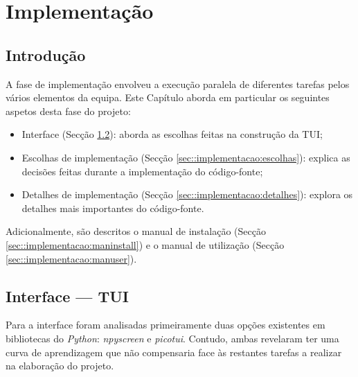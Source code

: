\chapter{Implementação}
\label{ch::implementacao}

\section{Introdução}
\label{sec::implementacao:intro}

A fase de implementação envolveu a execução paralela de diferentes tarefas pelos vários elementos da equipa. Este Capítulo aborda em particular os seguintes aspetos desta fase do projeto:

\begin{itemize}
    \item Interface (Secção \ref{sec::implementacao:tui}): aborda as escolhas feitas na construção da \acf{TUI};
    \item Escolhas de implementação (Secção \ref{sec::implementacao:escolhas}): explica as decisões feitas durante a implementação do código-fonte;
    \item Detalhes de implementação (Secção \ref{sec::implementacao:detalhes}): explora os detalhes mais importantes do código-fonte.
\end{itemize}

Adicionalmente, são descritos o manual de instalação (Secção \ref{sec::implementacao:maninstall}) e o manual de utilização (Secção \ref{sec::implementacao:manuser}).


\section{Interface --- \ac{TUI}}
\label{sec::implementacao:tui}

Para a interface foram analisadas primeiramente duas opções existentes em bibliotecas do \textit{Python}: \textit{npyscreen} e \textit{picotui}. Contudo, ambas revelaram ter uma curva de aprendizagem que não compensaria face às restantes tarefas a realizar na elaboração do projeto.

